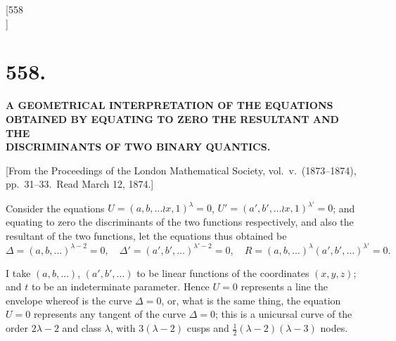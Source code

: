 \documentclass[11pt,a4paper]{book}
\begin{document}

\newpage
\setcounter{page}{16}

\begin{center}
[558\\
]
\end{center}

\section*{\textbf{558.}}

\begin{center}
{\large \textbf{A GEOMETRICAL INTERPRETATION OF THE EQUATIONS}}\\[4pt]
{\large \textbf{OBTAINED BY EQUATING TO ZERO THE RESULTANT AND THE}}\\[4pt]
{\large \textbf{DISCRIMINANTS OF TWO BINARY QUANTICS.}}
\end{center}

\begin{flushright}
{\small [From the Proceedings of the London Mathematical Society, vol.\ v.\ (1873--1874), pp.\ 31--33.\ Read March 12, 1874.]}
\end{flushright}

Consider the equations $U = (a, b, \ldots \wr x, 1)^\lambda = 0$, $U' = (a', b', \ldots \wr x, 1)^{\lambda'} = 0$; and equating to zero the discriminants of the two functions respectively, and also the resultant of the two functions, let the equations thus obtained be
\[
\Delta = (a, b, \ldots)^{\lambda-2} = 0,\quad \Delta' = (a', b', \ldots)^{\lambda'-2} = 0,\quad R = (a, b, \ldots)^\lambda (a', b', \ldots)^{\lambda'} = 0.
\]

I take $(a, b, \ldots)$, $(a', b', \ldots)$ to be linear functions of the coordinates $(x, y, z)$; and $t$ to be an indeterminate parameter. Hence $U = 0$ represents a line the envelope whereof is the curve $\Delta = 0$, or, what is the same thing, the equation $U = 0$ represents any tangent of the curve $\Delta = 0$; this is a unicursal curve of the order $2\lambda - 2$ and class $\lambda$, with $3(\lambda - 2)$ cusps and $\tfrac{1}{2}(\lambda - 2)(\lambda - 3)$ nodes.
\end{document}
